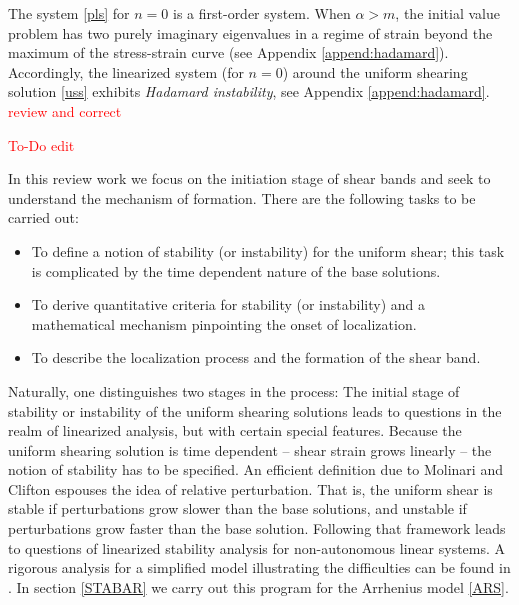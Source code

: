 \documentclass[a4paper,11pt]{article}
\newcommand{\tcr}{\textcolor{red}}
\theoremstyle{remark}
\begin{document}
The system \eqref{pls} for $n=0$ is a first-order system. When $\alpha > m$, the initial value problem  has two purely imaginary eigenvalues in a regime
of strain beyond the maximum of the stress-strain curve (see Appendix \ref{append:hadamard}).
Accordingly, the linearized system (for $n=0$) around the uniform shearing solution \eqref{uss} exhibits {\it Hadamard instability}, see Appendix \ref{append:hadamard}.
\tcr{review and correct}


\tcr{To-Do  edit}

\bigskip

In this review work we focus on the initiation stage of shear bands and seek to understand the
mechanism of formation.
There are the following tasks to be carried out:
\begin{itemize}
\item To define a notion of stability (or instability) for the uniform shear; this task is complicated
by the time dependent nature of the base solutions.
\item To derive quantitative criteria for stability (or instability) and a mathematical mechanism pinpointing the onset of localization.
\item To describe the localization process and the formation of the shear band.
\end{itemize}

Naturally, one distinguishes two stages in the process: The initial stage of stability or instability
of the uniform shearing solutions leads to questions in the realm of linearized analysis, but with
certain special features. Because the uniform shearing solution
is time dependent -- shear strain grows linearly -- the notion of stability has to be specified. An efficient definition due to
Molinari and Clifton \cite{MC87,FM87} espouses the idea of relative perturbation. That is, the uniform shear
is stable if perturbations grow slower than the base solutions, and unstable if perturbations grow
faster than the base solution. Following that framework leads to questions of linearized stability analysis
for non-autonomous linear systems.
A rigorous analysis for a simplified model illustrating the difficulties can be found in \cite{Tzavaras92}.
In section \ref{STABAR}  we carry out this program for the Arrhenius model \eqref{ARS}.
\end{document}
